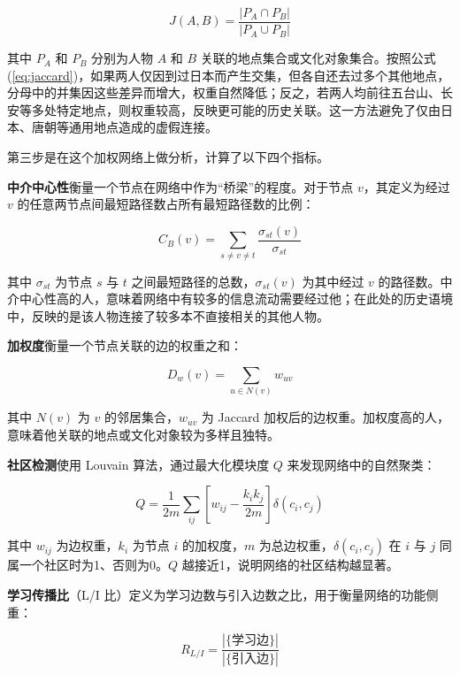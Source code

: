 \documentclass[12pt,a4paper]{article}
\begin{document}
\begin{equation}
J(A,B) = \frac{|P_A \cap P_B|}{|P_A \cup P_B|}
\label{eq:jaccard}
\end{equation}

其中 $P_A$ 和 $P_B$ 分别为人物 $A$ 和 $B$ 关联的地点集合或文化对象集合。按照公式(\ref{eq:jaccard})，如果两人仅因到过日本而产生交集，但各自还去过多个其他地点，分母中的并集因这些差异而增大，权重自然降低；反之，若两人均前往五台山、长安等多处特定地点，则权重较高，反映更可能的历史关联。这一方法避免了仅由日本、唐朝等通用地点造成的虚假连接。

第三步是在这个加权网络上做分析，计算了以下四个指标。

\textbf{中介中心性}衡量一个节点在网络中作为“桥梁”的程度。对于节点 $v$，其定义为经过 $v$ 的任意两节点间最短路径数占所有最短路径数的比例：

\begin{equation}
C_B(v) = \sum_{s \neq v \neq t} \frac{\sigma_{st}(v)}{\sigma_{st}}
\label{eq:betweenness}
\end{equation}

其中 $\sigma_{st}$ 为节点 $s$ 与 $t$ 之间最短路径的总数，$\sigma_{st}(v)$ 为其中经过 $v$ 的路径数。中介中心性高的人，意味着网络中有较多的信息流动需要经过他；在此处的历史语境中，反映的是该人物连接了较多本不直接相关的其他人物。

\textbf{加权度}衡量一个节点关联的边的权重之和：

\begin{equation}
D_w(v) = \sum_{u \in N(v)} w_{uv}
\label{eq:degree}
\end{equation}

其中 $N(v)$ 为 $v$ 的邻居集合，$w_{uv}$ 为 Jaccard 加权后的边权重。加权度高的人，意味着他关联的地点或文化对象较为多样且独特。

\textbf{社区检测}使用 Louvain 算法，通过最大化模块度 $Q$ 来发现网络中的自然聚类：

\begin{equation}
Q = \frac{1}{2m} \sum_{ij} \left[ w_{ij} - \frac{k_i k_j}{2m} \right] \delta(c_i, c_j)
\label{eq:modularity}
\end{equation}

其中 $w_{ij}$ 为边权重，$k_i$ 为节点 $i$ 的加权度，$m$ 为总边权重，$\delta(c_i, c_j)$ 在 $i$ 与 $j$ 同属一个社区时为1、否则为0。$Q$ 越接近1，说明网络的社区结构越显著。

\textbf{学习传播比}（L/I 比）定义为学习边数与引入边数之比，用于衡量网络的功能侧重：

\begin{equation}
R_{L/I} = \frac{|\{\text{学习边}\}|}{|\{\text{引入边}\}|}
\label{eq:li}
\end{equation}
\end{document}
